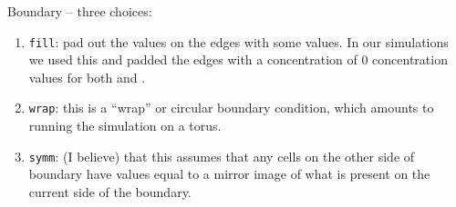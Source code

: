 Boundary -- three choices:

\begin{enumerate}
\item \texttt{fill}: pad out the values on the edges with some values. In our simulations we used this and padded the edges with a concentration of 0 concentration values for both  and .
\item \texttt{wrap}: this is a ``wrap'' or circular boundary condition, which amounts to running the simulation on a torus.
\item \texttt{symm}: (I believe) that this assumes that any cells on the other side of boundary have values equal to a mirror image of what is present on the current side of the boundary.
\end{enumerate}

\begin{exercise}[%
Deciding what happens at boundaries is an important part of modeling and simulations. In our Gray-Scott Reaction-Diffusion code, we have given the \texttt{signal.convolve2d()} the \texttt{boundary='fill'} parameter. There are additional options \texttt{'wrap'} and \texttt{'symm'}, which can be combined with the \texttt{'fillvalue'} option as documented here (\url{https://docs.scipy.org/doc/scipy/reference/generated/scipy.signal.convolve2d.html}).
]\end{exercise}
